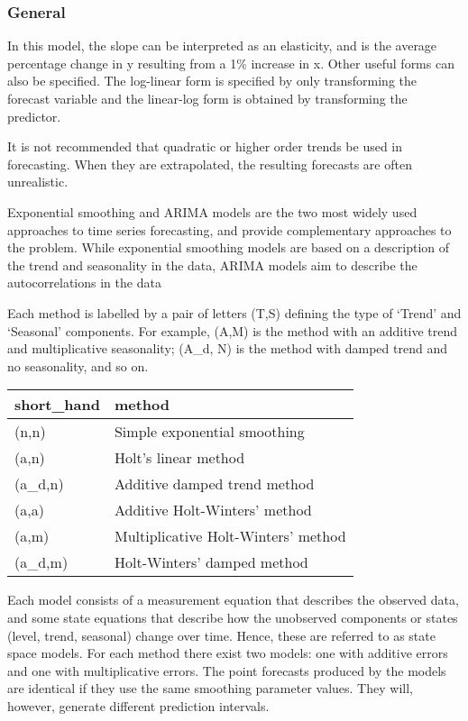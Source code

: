 \documentclass[]{book}
\begin{document}
\hypertarget{general-7}{%
\subsubsection{General}\label{general-7}}

In this model, the slope can be interpreted as an elasticity, and is the average percentage change in y resulting from a 1\% increase in x. Other useful forms can also be specified. The log-linear form is specified by only transforming the forecast variable and the linear-log form is obtained by transforming the predictor.

It is not recommended that quadratic or higher order trends be used in forecasting. When they are extrapolated, the resulting forecasts are often unrealistic.

Exponential smoothing and ARIMA models are the two most widely used approaches to time series forecasting, and provide complementary approaches to the problem. While exponential smoothing models are based on a description of the trend and seasonality in the data, ARIMA models aim to describe the autocorrelations in the data

Each method is labelled by a pair of letters (T,S) defining the type of `Trend' and `Seasonal' components. For example, (A,M) is the method with an additive trend and multiplicative seasonality; (A\_d, N) is the method with damped trend and no seasonality, and so on.

\begin{longtable}[]{@{}ll@{}}
\toprule
short\_hand & method\tabularnewline
\midrule
\endhead
(n,n) & Simple exponential smoothing\tabularnewline
(a,n) & Holt's linear method\tabularnewline
(a\_d,n) & Additive damped trend method\tabularnewline
(a,a) & Additive Holt-Winters' method\tabularnewline
(a,m) & Multiplicative Holt-Winters' method\tabularnewline
(a\_d,m) & Holt-Winters' damped method\tabularnewline
\bottomrule
\end{longtable}

Each model consists of a measurement equation that describes the observed data, and some state equations that describe how the unobserved components or states (level, trend, seasonal) change over time. Hence, these are referred to as state space models. For each method there exist two models: one with additive errors and one with multiplicative errors. The point forecasts produced by the models are identical if they use the same smoothing parameter values. They will, however, generate different prediction intervals.
\end{document}

